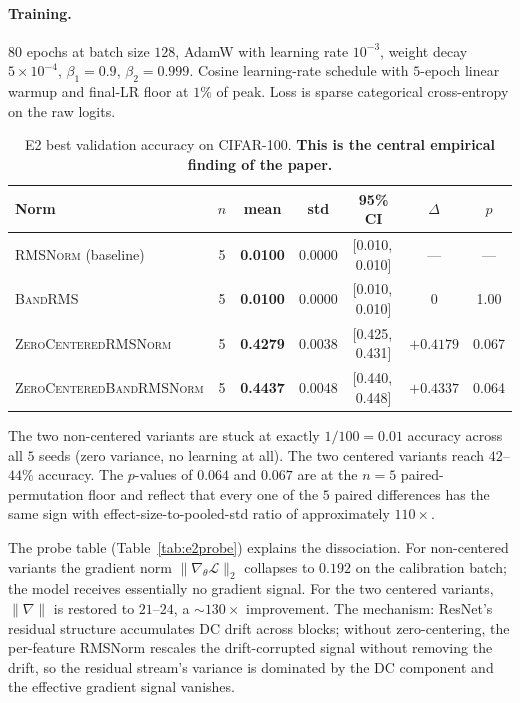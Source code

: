 \documentclass{article}
\newcommand{\rms}{\textsc{RMSNorm}}
\newcommand{\bandrms}{\textsc{BandRMS}}
\newcommand{\zcrms}{\textsc{ZeroCentered}\-\textsc{RMSNorm}}
\newcommand{\zcband}{\textsc{ZeroCentered}\-\textsc{BandRMSNorm}}
\begin{document}
\paragraph{Training.}
$80$ epochs at batch size $128$, AdamW with learning rate $10^{-3}$, weight decay $5 \times 10^{-4}$, $\beta_1 = 0.9$, $\beta_2 = 0.999$.
Cosine learning-rate schedule with $5$-epoch linear warmup and final-LR floor at $1\%$ of peak.
Loss is sparse categorical cross-entropy on the raw logits.

\begin{table}[H]
\centering
\caption{E2 best validation accuracy on CIFAR-100. \textbf{This is the central empirical finding of the paper.}}
\label{tab:e2}
\renewcommand{\arraystretch}{1.15}
\begin{tabular}{lcccccc}
\toprule
\textbf{Norm} & \textbf{$n$} & \textbf{mean} & \textbf{std} & \textbf{95\% CI} & \textbf{$\Delta$} & \textbf{$p$} \\
\midrule
\rms{} (baseline)                   & 5 & \textbf{0.0100} & 0.0000 & [0.010,\,0.010] & --- & --- \\
\bandrms{}                          & 5 & \textbf{0.0100} & 0.0000 & [0.010,\,0.010] & $0$       & 1.00 \\
\zcrms{}                            & 5 & \textbf{0.4279} & 0.0038 & [0.425,\,0.431] & $+0.4179$ & 0.067 \\
\zcband{}                           & 5 & \textbf{0.4437} & 0.0048 & [0.440,\,0.448] & $+0.4337$ & 0.064 \\
\bottomrule
\end{tabular}
\end{table}

The two non-centered variants are stuck at exactly $1/100 = 0.01$ accuracy across all $5$ seeds (zero variance, no learning at all).
The two centered variants reach $42$--$44\%$ accuracy.
The $p$-values of $0.064$ and $0.067$ are at the $n{=}5$ paired-permutation floor and reflect that every one of the $5$ paired differences has the same sign with effect-size-to-pooled-std ratio of approximately $110\times$.

The probe table (Table~\ref{tab:e2probe}) explains the dissociation.
For non-centered variants the gradient norm $\|\nabla_\theta \mathcal{L}\|_2$ collapses to $0.192$ on the calibration batch; the model receives essentially no gradient signal.
For the two centered variants, $\|\nabla\|$ is restored to $21$--$24$, a $\sim 130\times$ improvement.
The mechanism: ResNet's residual structure accumulates DC drift across blocks; without zero-centering, the per-feature RMSNorm rescales the drift-corrupted signal without removing the drift, so the residual stream's variance is dominated by the DC component and the effective gradient signal vanishes.
\end{document}
